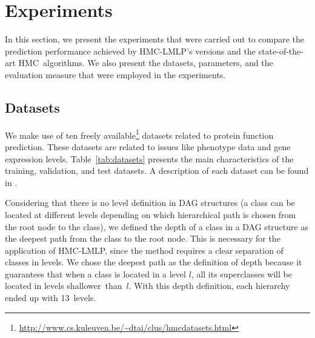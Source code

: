 \section{Experiments}\label{sec:experiments}

In this section, we present the experiments that were carried out to compare the prediction performance achieved by HMC-LMLP's versions and the state-of-the-art HMC~algorithms. We also present the datasets, parameters, and the evaluation measure that were employed in the experiments.

\subsection{Datasets}

We make use of ten freely available\footnote{\url{http://www.cs.kuleuven.be/~dtai/clus/hmcdatasets.html}} datasets related to protein function prediction. These datasets are related to issues like phenotype data and gene expression levels. Table~\ref{tab:datasets} presents the main characteristics of the training, validation, and test datasets. A description of each dataset can be found in \cite{Vens2008}.

Considering that there is no level definition in DAG structures (a class can be located at different levels depending on which hierarchical path is chosen from the root node to the class), we defined the depth of a class in a DAG structure as the deepest path from the class to the root node. This is necessary for the application of HMC-LMLP, since the method requires a clear separation of classes in levels. We chose the deepest path as the definition of depth because it guarantees that when a class is located in a level $l$, all its superclasses will be located in levels shallower~than~$l$. With this depth definition, each hierarchy ended up with 13~levels.

